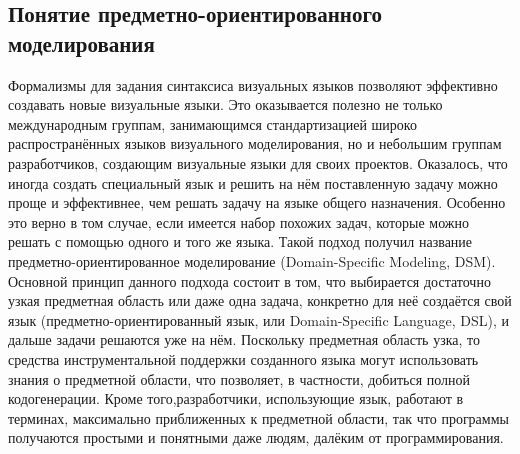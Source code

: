 \subsection{Понятие предметно-ориентированного моделирования}
Формализмы для задания синтаксиса визуальных языков позволяют эффективно 
создавать новые визуальные языки. Это оказывается полезно не только 
международным группам, занимающимся стандартизацией широко распространённых 
языков визуального моделирования, но и небольшим группам разработчиков, 
создающим визуальные языки для своих проектов. Оказалось, что иногда создать 
специальный язык и решить на нём поставленную задачу можно проще и эффективнее, 
чем решать задачу на языке общего назначения. Особенно это верно в том случае, 
если имеется набор похожих задач, которые можно решать с помощью одного и того 
же языка. Такой подход получил название предметно-ориентированное моделирование 
(Domain-Specific Modeling, DSM). Основной принцип данного подхода состоит в том, 
что выбирается достаточно узкая предметная область или даже одна задача, 
конкретно для неё создаётся свой язык (предметно-ориентированный язык, или 
Domain-Specific Language, DSL), и дальше задачи решаются уже на нём. Поскольку 
предметная область узка, то средства инструментальной поддержки созданного языка 
могут использовать знания о предметной области, что позволяет, в частности, 
добиться полной кодогенерации. Кроме того,разработчики, использующие язык, 
работают в терминах, максимально приближенных к предметной области, так что 
программы получаются простыми и понятными даже людям, далёким от 
программирования.

